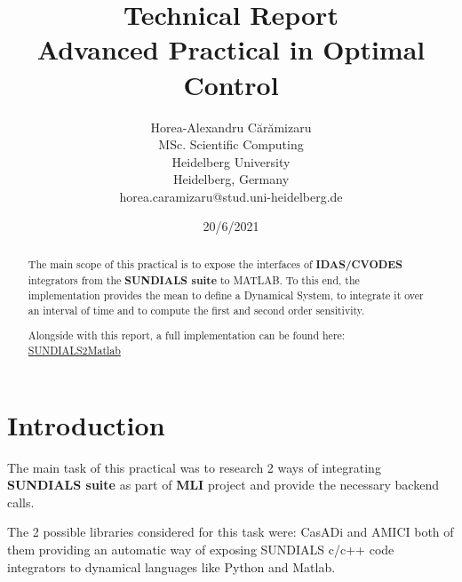 \documentclass[12pt, letterpaper]{article}
\begin{document}
\title{Technical Report \\  Advanced Practical in Optimal Control }



\author{ Horea-Alexandru C\u{a}r\u{a}mizaru \\
MSc. Scientific Computing\\
Heidelberg University \\
Heidelberg, Germany \\
horea.caramizaru@stud.uni-heidelberg.de
}
\date{20/6/2021}


\maketitle

\begin{abstract}

The main scope of this practical is to expose the interfaces of \textbf{IDAS/CVODES} integrators from the \textbf{SUNDIALS suite} \cite{hindmarsh2005sundials} to MATLAB. To this end, the implementation provides the mean to define a Dynamical System, to integrate it over an interval of time and to compute the first and second order sensitivity.

Alongside with this report, a full implementation can be found here: \href{https://github.com/nashmit/SUNDIALS2Matlab}{SUNDIALS2Matlab}

\end{abstract}





\section{Introduction}
The main task of this practical was to research 2 ways of integrating \textbf{SUNDIALS suite} as part of \textbf{MLI}  project and provide the necessary backend calls.

The 2 possible libraries considered for this task were: CasADi \cite{Andersson2018} and AMICI \cite{frohlich2020amici} both of them providing an automatic way of exposing SUNDIALS c/c++ code integrators to dynamical languages like Python and Matlab.
\end{document}
